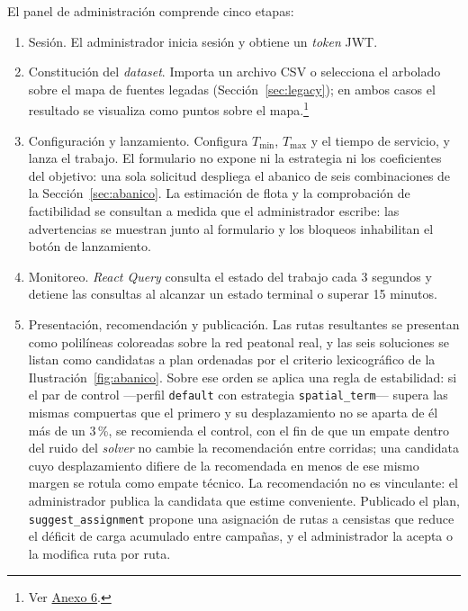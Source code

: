 El panel de administración comprende cinco etapas:

\begin{enumerate}
  \item Sesión. El administrador inicia sesión y obtiene un \textit{token} JWT.
  \item Constitución del \textit{dataset}. Importa un archivo CSV o selecciona el arbolado sobre el
        mapa de fuentes legadas (Sección~\ref{sec:legacy}); en ambos casos el resultado se visualiza
        como puntos sobre el mapa.\footnote{Ver \hyperref[anx:capturas]{Anexo 6}.}
  \item Configuración y lanzamiento. Configura $T_{\min}$, $T_{\max}$ y el tiempo de servicio, y
        lanza el trabajo. El formulario no expone ni la estrategia ni los coeficientes del objetivo:
        una sola solicitud despliega el abanico de seis combinaciones de la
        Sección~\ref{sec:abanico}. La estimación de flota y la comprobación de factibilidad se
        consultan a medida que el administrador escribe: las advertencias se muestran junto al
        formulario y los bloqueos inhabilitan el botón de lanzamiento.
  \item Monitoreo. \textit{React Query} consulta el estado del trabajo cada 3 segundos y detiene
        las consultas al alcanzar un estado terminal o superar 15 minutos.
  \item Presentación, recomendación y publicación. Las rutas resultantes se presentan como
        polilíneas coloreadas sobre la red peatonal real, y las seis soluciones se listan como
        candidatas a plan ordenadas por el criterio lexicográfico de la
        Ilustración~\ref{fig:abanico}. Sobre ese orden se aplica una regla de estabilidad: si el
        par de control ---perfil \texttt{default} con estrategia \texttt{spatial\_term}--- supera
        las mismas compuertas que el primero y su desplazamiento no se aparta de él más de un
        $3$\,\%, se recomienda el control, con el fin de que un empate dentro del ruido del
        \textit{solver} no cambie la recomendación entre corridas; una candidata cuyo
        desplazamiento difiere de la recomendada en menos de ese mismo margen se rotula como empate
        técnico. La recomendación no es vinculante: el administrador publica la candidata que
        estime conveniente. Publicado el plan, \texttt{suggest\_assignment} propone una asignación
        de rutas a censistas que reduce el déficit de carga acumulado entre campañas, y el
        administrador la acepta o la modifica ruta por ruta.
\end{enumerate}

